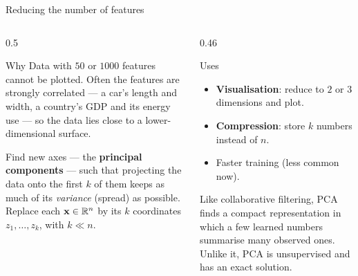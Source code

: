\documentclass[aspectratio=169,10pt]{beamer}
\begin{document}
\begin{frame}{Reducing the number of features}
  \begin{columns}[T,onlytextwidth]
    \begin{column}{0.5\textwidth}
      \footnotesize
      \begin{block}{Why}
        Data with $50$ or $1000$ features cannot be plotted. Often the features are
        strongly correlated --- a car's length and width, a country's GDP and its
        energy use --- so the data lies close to a lower-dimensional surface.
      \end{block}
      \begin{defnbox}
        \small Find new axes --- the \textbf{principal components} --- such that projecting
        the data onto the first $k$ of them keeps as much of its \emph{variance} (spread)
        as possible. Replace each $\mathbf{x}\in\mathbb{R}^n$ by its $k$ coordinates
        $z_1,\dots,z_k$, with $k \ll n$.
      \end{defnbox}
    \end{column}
    \begin{column}{0.46\textwidth}
      \footnotesize
      \begin{block}{Uses}
        \begin{itemize}
          \item \textbf{Visualisation}: reduce to $2$ or $3$ dimensions and plot.
          \item \textbf{Compression}: store $k$ numbers instead of $n$.
          \item Faster training (less common now).
        \end{itemize}
      \end{block}
      \begin{keyidea}
        Like collaborative filtering, PCA finds a compact representation in which a few
        learned numbers summarise many observed ones. Unlike it, PCA is unsupervised
        and has an exact solution.
      \end{keyidea}
    \end{column}
  \end{columns}
\end{frame}
\end{document}
